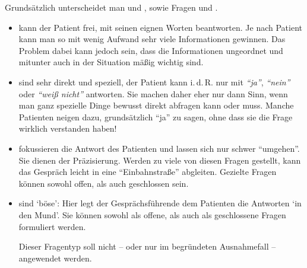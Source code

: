 \documentclass[
ngerman,
paper=a4,
asymmetric,
fontsize=10pt,
draft=false,
numbers=noenddot,
bibtotocnumbered,
footnotes=multiple,
]{scrreprt}
\begin{document}
{
Grundsätzlich unterscheidet man  und
, sowie  Fragen und
.

\begin{itemize}
  \item {} kann der Patient frei, mit
  seinen eignen Worten beantworten. Je nach Patient kann man so
  mit wenig Aufwand sehr viele Informationen gewinnen. Das
  Problem dabei kann jedoch sein, dass die Informationen
  ungeordnet und mitunter auch in der Situation mäßig wichtig
  sind.
  
  \begin{quote}
    
  \end{quote}
  
  
  \item {} sind sehr direkt und
  speziell, der Patient kann i.\,d.\,R. nur mit
  \emph{\enquote{ja}}, \emph{\enquote{nein}} oder
  \emph{\enquote{weiß nicht}} antworten. Sie machen daher
  eher nur dann Sinn, wenn man ganz spezielle Dinge bewusst
  direkt abfragen kann oder muss.  Manche
  Patienten neigen dazu, grundsätzlich \enquote{ja} zu
  sagen, ohne dass sie die Frage wirklich verstanden haben!
  
  \begin{quote}
    
  \end{quote}
  
  \item {} fokussieren die Antwort des
  Patienten und
  lassen sich nur schwer \enquote{umgehen}. Sie dienen der
  Präzisierung. Werden zu
  viele von diesen Fragen gestellt, kann das Gespräch leicht
  in eine \enquote{Einbahnstraße} abgleiten. Gezielte Fragen können
  sowohl offen, als auch geschlossen sein.
  \begin{quote}
  \end{quote}
  
  \item {} sind \enquote*{böse}: Hier
  legt der Gesprächsführende dem Patienten die Antworten \enquote*{in
  den Mund}. Sie können sowohl als offene, als auch als
  geschlossene Fragen formuliert werden.
  
  \begin{quote}
    
  \end{quote}
  
  Dieser Fragentyp soll nicht -- oder nur im begründeten
  Ausnahmefall -- angewendet werden.
\end{itemize}



}
\end{document}
